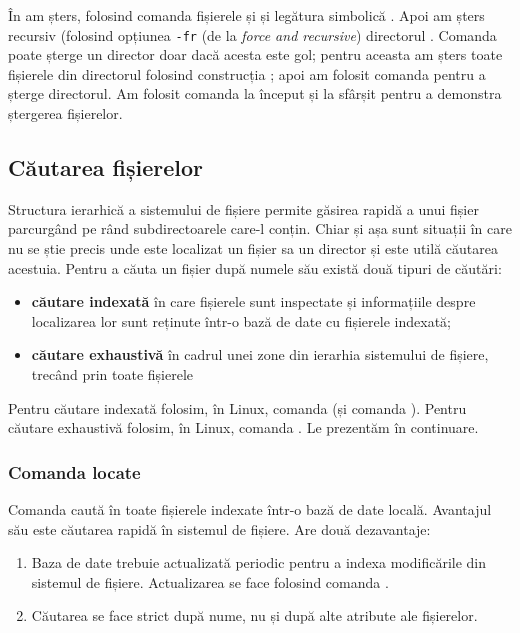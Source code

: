 În  am șters, folosind comanda  fișierele  și  și legătura simbolică .
Apoi am șters recursiv (folosind opțiunea \texttt{-fr} (de la \textit{force and recursive}) directorul .
Comanda  poate șterge un director doar dacă acesta este gol;
pentru aceasta am șters toate fișierele din directorul  folosind construcția ;
apoi am folosit comanda  pentru a șterge directorul.
Am folosit comanda  la început și la sfârșit pentru a demonstra ștergerea fișierelor.

\subsection{Căutarea fișierelor}
\label{sec:fs:search}

Structura ierarhică a sistemului de fișiere permite găsirea rapidă a unui fișier parcurgând pe rând subdirectoarele care-l conțin.
Chiar și așa sunt situații în care nu se știe precis unde este localizat un fișier sa un director și este utilă căutarea acestuia.
Pentru a căuta un fișier după numele său există două tipuri de căutări:

\begin{itemize}
  \item \textbf{căutare indexată} în care fișierele sunt inspectate și informațiile despre localizarea lor sunt reținute într-o bază de date cu fișierele indexată;
  \item \textbf{căutare exhaustivă} în cadrul unei zone din ierarhia sistemului de fișiere, trecând prin toate fișierele
\end{itemize}

Pentru căutare indexată folosim, în Linux, comanda  (și comanda ).
Pentru căutare exhaustivă folosim, în Linux, comanda .
Le prezentăm în continuare.

\subsubsection{Comanda locate}
\label{sec:fs:locate}

Comanda  caută în toate fișierele indexate într-o bază de date locală.
Avantajul său este căutarea rapidă în sistemul de fișiere.
Are două dezavantaje:

\begin{enumerate}
  \item Baza de date trebuie actualizată periodic pentru a indexa modificările din sistemul de fișiere.
    Actualizarea se face folosind comanda .
  \item Căutarea se face strict după nume, nu și după alte atribute ale fișierelor.
\end{enumerate}

